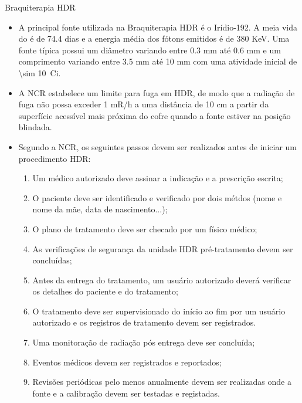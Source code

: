 \documentclass[11pt,a4paper]{article}
\newcounter{exemplo}
\begin{document}
\begin{exemplo}[8. Braquiterapia]
\begin{itemize}
    \end{itemize}

    \textcolor{CarnationPink}{Braquiterapia HDR}
    \begin{itemize}
        \item A principal fonte utilizada na Braquiterapia HDR é o Irídio-192. A meia vida do  é de 74.4 dias e a energia média dos fótons emitidos é de 380 KeV. Uma fonte típica possui um diâmetro variando entre 0.3 mm até 0.6 mm e um comprimento variando entre 3.5 mm até 10 mm com uma atividade inicial de \qty{\sim 10}{Ci}.
        
        \item A NCR estabelece um limite para fuga em HDR, de modo que a radiação de fuga não possa exceder 1 mR/h a uma distância de 10 cm a partir da superfície acessível mais próxima do cofre quando a fonte estiver na posição blindada. 
        
        \item Segundo a NCR, os seguintes passos devem ser realizados antes de iniciar um procedimento HDR:
        
            \begin{enumerate}[label=\textcolor{CarnationPink}{\roman*.}]
                \item Um médico autorizado deve assinar a indicação e a prescrição escrita;
                \item O paciente deve ser identificado e verificado por dois métdos (nome e nome da mãe, data de nascimento...);
                \item O plano de tratamento deve ser checado por um físico médico;
                \item As verificações de segurança da unidade HDR pré-tratamento devem ser concluídas;
                \item Antes da entrega do tratamento, um usuário autorizado deverá verificar os detalhes do paciente e do tratamento;
                \item O tratamento deve ser supervisionado do início ao fim por um usuário autorizado e os registros de tratamento devem ser registrados.
                \item Uma monitoração de radiação pós entrega deve ser concluída;
                \item Eventos médicos devem ser registrados e reportados;
                \item Revisões periódicas pelo menos anualmente devem ser realizadas onde a fonte e a calibração devem ser testadas e registadas. 
            \end{enumerate}


\end{itemize}
\end{exemplo}
\end{document}
